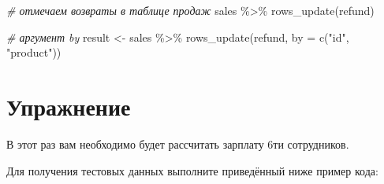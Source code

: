 \documentclass[
]{book}
\newenvironment{Shaded}{\begin{snugshade}}{\end{snugshade}}
\newcommand{\AttributeTok}[1]{\textcolor[rgb]{0.77,0.63,0.00}{#1}}
\newcommand{\CommentTok}[1]{\textcolor[rgb]{0.56,0.35,0.01}{\textit{#1}}}
\newcommand{\FunctionTok}[1]{\textcolor[rgb]{0.00,0.00,0.00}{#1}}
\newcommand{\NormalTok}[1]{#1}
\newcommand{\OtherTok}[1]{\textcolor[rgb]{0.56,0.35,0.01}{#1}}
\newcommand{\SpecialCharTok}[1]{\textcolor[rgb]{0.00,0.00,0.00}{#1}}
\newcommand{\StringTok}[1]{\textcolor[rgb]{0.31,0.60,0.02}{#1}}
\begin{document}
\begin{Shaded}
\begin{Highlighting}[]
\CommentTok{\# отмечаем возвраты в таблице продаж}
\NormalTok{sales }\SpecialCharTok{\%\textgreater{}\%}
  \FunctionTok{rows\_update}\NormalTok{(refund)}

\CommentTok{\# аргумент by}
\NormalTok{result }\OtherTok{\textless{}{-}}
\NormalTok{  sales }\SpecialCharTok{\%\textgreater{}\%}
    \FunctionTok{rows\_update}\NormalTok{(refund, }\AttributeTok{by =} \FunctionTok{c}\NormalTok{(}\StringTok{"id"}\NormalTok{, }\StringTok{"product"}\NormalTok{))}
\end{Highlighting}
\end{Shaded}

\hypertarget{ux443ux43fux440ux430ux436ux43dux435ux43dux438ux435-1}{%
\section{Упражнение}\label{ux443ux43fux440ux430ux436ux43dux435ux43dux438ux435-1}}

В этот раз вам необходимо будет рассчитать зарплату 6ти сотрудников.

Для получения тестовых данных выполните приведённый ниже пример кода:
\end{document}

